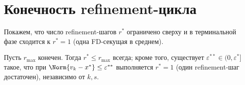 \section{Конечность refinement-цикла}
\label{sec:app-afd:rstar}

Покажем, что число refinement-шагов $r^{*}$ ограничено сверху и в
терминальной фазе сходится к $r^{*} = 1$ (одна FD-секущая в среднем).

\begin{proposition}[Ограниченность $r^{*}$]
\label{prop:app-afd:rstar}
Пусть $r_{\max}$ конечен. Тогда $r^{*} \le r_{\max}$ всегда; кроме того,
существует $\varepsilon^{**} \in (0, \varepsilon^{*}]$ такое, что при
$\Norm{v_k - x^{*}} \le \varepsilon^{**}$ выполняется $r^{*} = 1$
(один refinement-шаг достаточен), независимо от $k, s$.
\end{proposition}

